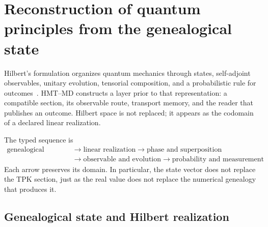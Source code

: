 \section{Reconstruction of quantum principles from the genealogical state}
\label{v:v:rec:sec:postulados-cuanticos-genealogicos-rev2}

Hilbert's formulation organizes quantum mechanics through states,
self-adjoint observables, unitary evolution, tensorial composition, and a
probabilistic rule for outcomes~\cite{v:vonNeumann1932}. HMT--MD
constructs a layer prior to that representation: a compatible section,
its observable route, transport memory, and the reader that publishes an
outcome. Hilbert space is not replaced; it appears as the codomain of
a declared linear realization.

The typed sequence is
\[
 \boxed{\begin{aligned}
 \text{genealogical section}
 &\longrightarrow \text{linear realization}
 \longrightarrow \text{phase and superposition}\\
 &\longrightarrow \text{observable and evolution}
 \longrightarrow \text{probability and measurement}
 \end{aligned}}
\]
Each arrow preserves its domain. In particular, the state vector does not
replace the TPK section, just as the real value does not replace
the numerical genealogy that produces it.

\subsection{Genealogical state and Hilbert realization}
\label{v:v:rec:realizacion_evolucion:section:02}

